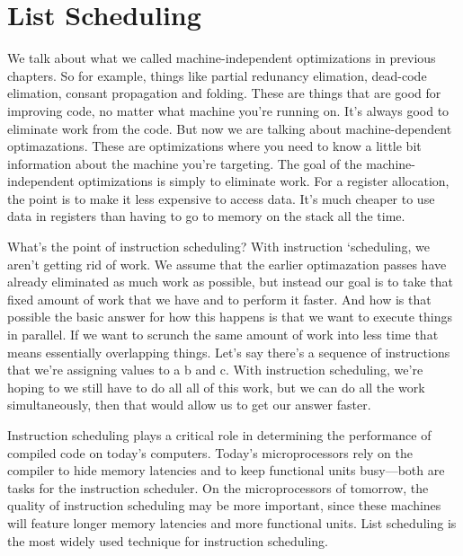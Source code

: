 \newpage


\section{List Scheduling}


We talk about what we called
machine-independent optimizations in previous chapters. So for example, things like
partial redunancy elimation, dead-code elimation, consant propagation and
folding. These are things that are good for improving code, no matter
what machine you're running on. It's always good to eliminate work
from the code. But now we are talking about machine-dependent optimazations.
These are optimizations where you need to know a little bit information
about the machine you're targeting. The goal of the machine-independent
optimizations is simply to eliminate work. For a register allocation, the point
is to make it less expensive to access data. It's much cheaper to use data in
registers than having to go to memory on the stack all the time.

What's the point of instruction scheduling? With instruction `scheduling,
we aren't getting rid of work. We assume that the earlier optimazation passes have
already eliminated as much work as possible, but instead our goal is to take that
fixed amount of work that we have and to perform it faster. And how is that possible
the basic answer for how this happens is that we want to execute things in parallel.
If we want to scrunch the same amount of work into less time that means essentially
overlapping things. Let's say there's a sequence of instructions that we're assigning
values to a b and c. With instruction scheduling, we're hoping to we still have to do all
all of this work, but we can do all the work simultaneously, then that would allow
us to get our answer faster.


Instruction scheduling\cite{cooper1998experimental} plays a critical role in determining the performance of compiled code on today’s
computers. Today’s microprocessors rely on the compiler to hide memory latencies and to keep functional
units busy—both are tasks for the instruction scheduler. On the microprocessors of tomorrow, the quality
of instruction scheduling may be more important, since these machines will feature longer memory latencies
and more functional units. List scheduling is the most widely used technique for instruction scheduling.


